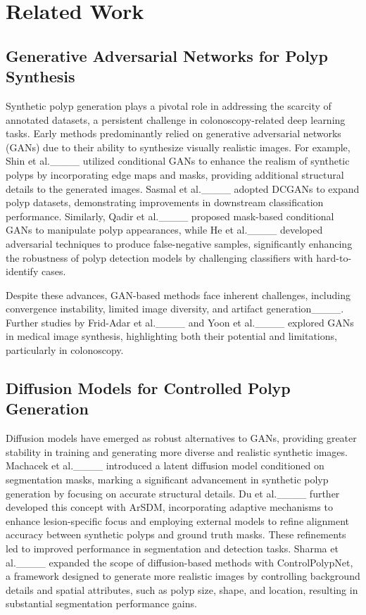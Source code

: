 \section{Related Work}
\subsection{Generative Adversarial Networks for Polyp Synthesis}

Synthetic polyp generation plays a pivotal role in addressing the scarcity of annotated datasets, a persistent challenge in colonoscopy-related deep learning tasks. Early methods predominantly relied on generative adversarial networks (GANs) due to their ability to synthesize visually realistic images. For example, Shin et al.____ utilized conditional GANs to enhance the realism of synthetic polyps by incorporating edge maps and masks, providing additional structural details to the generated images. Sasmal et al.____ adopted DCGANs to expand polyp datasets, demonstrating improvements in downstream classification performance. Similarly, Qadir et al.____ proposed mask-based conditional GANs to manipulate polyp appearances, while He et al.____ developed adversarial techniques to produce false-negative samples, significantly enhancing the robustness of polyp detection models by challenging classifiers with hard-to-identify cases.

Despite these advances, GAN-based methods face inherent challenges, including convergence instability, limited image diversity, and artifact generation____. Further studies by Frid-Adar et al.____ and Yoon et al.____ explored GANs in medical image synthesis, highlighting both their potential and limitations, particularly in colonoscopy.

\subsection{Diffusion Models for Controlled Polyp Generation}

Diffusion models have emerged as robust alternatives to GANs, providing greater stability in training and generating more diverse and realistic synthetic images. Machacek et al.____ introduced a latent diffusion model conditioned on segmentation masks, marking a significant advancement in synthetic polyp generation by focusing on accurate structural details. Du et al.____ further developed this concept with ArSDM, incorporating adaptive mechanisms to enhance lesion-specific focus and employing external models to refine alignment accuracy between synthetic polyps and ground truth masks. These refinements led to improved performance in segmentation and detection tasks. Sharma et al.____ expanded the scope of diffusion-based methods with ControlPolypNet, a framework designed to generate more realistic images by controlling background details and spatial attributes, such as polyp size, shape, and location, resulting in substantial segmentation performance gains.

